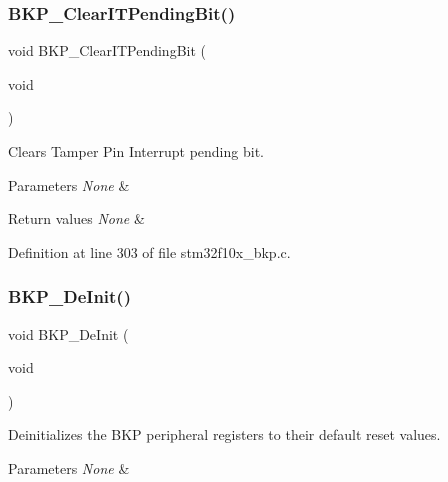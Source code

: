 \subsubsection{\texorpdfstring{B\+K\+P\+\_\+\+Clear\+I\+T\+Pending\+Bit()}{BKP\_ClearITPendingBit()}}
{\footnotesize\ttfamily void B\+K\+P\+\_\+\+Clear\+I\+T\+Pending\+Bit (\begin{DoxyParamCaption}\item[{void}]{ }\end{DoxyParamCaption})}



Clears Tamper Pin Interrupt pending bit. 


\begin{DoxyParams}{Parameters}
{\em None} & \\
\hline
\end{DoxyParams}

\begin{DoxyRetVals}{Return values}
{\em None} & \\
\hline
\end{DoxyRetVals}


Definition at line 303 of file stm32f10x\+\_\+bkp.\+c.

\mbox{\label{group___b_k_p___exported___functions_gaabff4d8f5ebf4fd9a840bcc9042ca226}} 
\subsubsection{\texorpdfstring{B\+K\+P\+\_\+\+De\+Init()}{BKP\_DeInit()}}
{\footnotesize\ttfamily void B\+K\+P\+\_\+\+De\+Init (\begin{DoxyParamCaption}\item[{void}]{ }\end{DoxyParamCaption})}



Deinitializes the B\+KP peripheral registers to their default reset values. 


\begin{DoxyParams}{Parameters}
{\em None} & \\
\hline
\end{DoxyParams}


